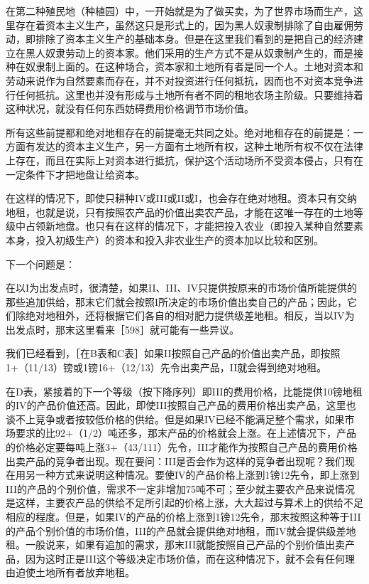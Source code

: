 在第二种殖民地（种植园）中，一开始就是为了做买卖，为了世界市场而生产，这里存在着资本主义生产，虽然这只是形式上的，因为黑人奴隶制排除了自由雇佣劳动，即排除了资本主义生产的基础本身。但是在这里我们看到的是把自己的经济建立在黑人奴隶劳动上的资本家。他们采用的生产方式不是从奴隶制产生的，而是接种在奴隶制上面的。在这种场合，资本家和土地所有者是同一个人。土地对资本和劳动来说作为自然要素而存在，并不对投资进行任何抵抗，因而也不对资本竞争进行任何抵抗。这里也并没有形成与土地所有者不同的租地农场主阶级。只要维持着这种状况，就没有任何东西妨碍费用价格调节市场价值。

所有这些前提都和绝对地租存在的前提毫无共同之处。绝对地租存在的前提是：一方面有发达的资本主义生产，另一方面有土地所有权，这种土地所有权不仅在法律上存在，而且在实际上对资本进行抵抗，保护这个活动场所不受资本侵占，只有在一定条件下才把地盘让给资本。

在这样的情况下，即使只耕种IV或III或II或I，也会存在绝对地租。资本只有交纳地租，也就是说，只有按照农产品的价值出卖农产品，才能在这唯一存在的土地等级中占领新地盘。也只有在这样的情况下，才能把投入农业（即投入某种自然要素本身，投入初级生产）的资本和投入非农业生产的资本加以比较和区别。

下一个问题是：

在以I为出发点时，很清楚，如果II、III、IV只提供按原来的市场价值所能提供的那些追加供给，那末它们就会按照I所决定的市场价值出卖自己的产品；因此，它们除绝对地租外，还将根据它们各自的相对肥力提供级差地租。相反，当以IV为出发点时，那末这里看来［598］就可能有一些异议。

我们已经看到，［在B表和C表］如果II按照自己产品的价值出卖产品，即按照1+（11/13）镑或1镑16+（12/13）先令出卖产品，II就会得到绝对地租。

在D表，紧接着的下一个等级（按下降序列）即III的费用价格，比能提供10镑地租的IV的产品价值还高。因此，即使III按照自己产品的费用价格出卖产品，这里也谈不上竞争或者按较低价格的供给。但是如果IV已经不能满足整个需求，如果市场要求的比92+（1/2）吨还多，那末产品的价格就会上涨。在上述情况下，产品的价格必定要每吨上涨3+（43/111）先令，III才能作为按照自己产品的费用价格出卖产品的竞争者出现。现在要问：III是否会作为这样的竞争者出现呢？我们现在用另一种方式来说明这种情况。要使IV的产品价格上涨到1镑12先令，即上涨到III的产品的个别价值，需求不一定非增加75吨不可；至少就主要农产品来说情况是这样，主要农产品的供给不足所引起的价格上涨，大大超过与算术上的供给不足相应的程度。但是，如果IV的产品的价格上涨到1镑12先令，那末按照这种等于III的产品个别价值的市场价值，III的产品就会提供绝对地租，而IV就会提供级差地租。一般说来，如果有追加的需求，那末III就能按照自己产品的个别价值出卖产品，因为这时正是III这个等级决定市场价值，而在这种情况下，就不会有任何理由迫使土地所有者放弃地租。

